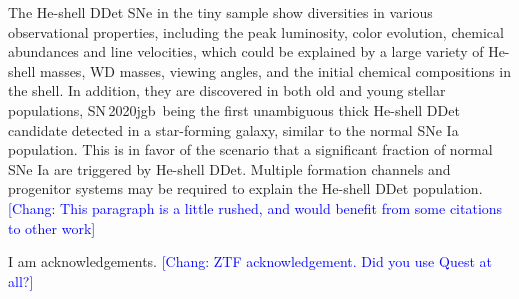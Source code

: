 \documentclass[twocolumn]{aastex631}
\newcommand{\sn}{SN\,2020jgb}
\newcommand{\chang}[1]{\textcolor{blue}{[Chang: #1]}}
\begin{document}
The He-shell DDet SNe in the tiny sample show diversities in various observational properties, including the peak luminosity, color evolution, chemical abundances and line velocities, which could be explained by a large variety of He-shell masses, WD masses, viewing angles, and the initial chemical compositions in the shell. In addition, they are discovered in both old and young stellar populations, \sn\ being the first unambiguous thick He-shell DDet candidate detected in a star-forming galaxy, similar to the normal SNe Ia population. This is in favor of the scenario that a significant fraction of normal SNe Ia are triggered by He-shell DDet. Multiple formation channels and progenitor systems may be required to explain the He-shell DDet population. \chang{This paragraph is a little rushed, and would benefit from some citations to other work}

\begin{acknowledgements}
    I am acknowledgements. \chang{ZTF acknowledgement. Did you use Quest at all?}
\end{acknowledgements}







\end{document}
